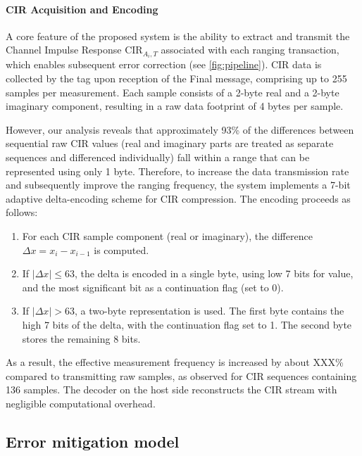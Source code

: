 \paragraph{CIR Acquisition and Encoding}

A core feature of the proposed system is the ability to extract and transmit the Channel Impulse Response $\text{CIR}_{A_i,T}$ associated with each ranging transaction, which enables subsequent error correction (see \autoref{fig:pipeline}). CIR data is collected by the tag upon reception of the Final message, comprising up to 255 samples per measurement. Each sample consists of a 2-byte real and a 2-byte imaginary component, resulting in a raw data footprint of 4 bytes per sample.

However, our analysis reveals that approximately 93\% of the differences between sequential raw CIR values (real and imaginary parts are treated as separate sequences and differenced individually) fall within a range that can be represented using only 1 byte. Therefore, to increase the data transmission rate and subsequently improve the ranging frequency, the system implements a 7-bit adaptive delta-encoding scheme for CIR compression. The encoding proceeds as follows: 

\begin{enumerate} 
    \item For each CIR sample component (real or imaginary), the difference $\Delta x = x_i - x_{i-1}$ is computed. 
    \item If $|\Delta x| \leq 63$, the delta is encoded in a single byte, using low 7 bits for value, and the most significant bit as a continuation flag (set to 0). 
    \item If $|\Delta x| > 63$, a two-byte representation is used. The first byte contains the high 7 bits of the delta, with the continuation flag set to 1. The second byte stores the remaining 8 bits. 
\end{enumerate} 

As a result, the effective measurement frequency is increased by about XXX\% compared to transmitting raw samples, as observed for CIR sequences containing 136 samples. The decoder on the host side reconstructs the CIR stream with negligible computational overhead.

\subsection{Error mitigation model}

